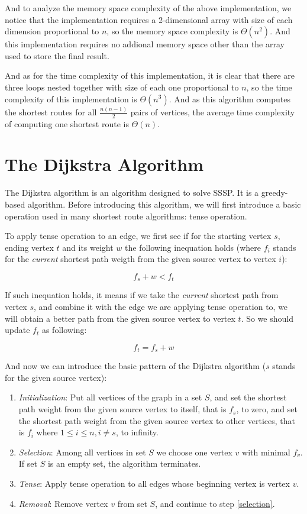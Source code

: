 \documentclass[a4paper,11pt,twocolumn]{article}
\begin{document}
And to analyze the memory space complexity of the above implementation, we notice that the implementation requires a 2-dimensional array with size of each dimension proportional to $n$, so the memory space complexity is $\Theta(n^2)$. And this implementation requires no addional memory space other than the array used to store the final result. 

And as for the time complexity of this implementation, it is clear that there are three loops nested together with size of each one proportional to $n$, so the time complexity of this implementation is $\Theta(n^3)$. And as this algorithm computes the shortest routes for all $\frac{n(n-1)}{2}$ pairs of vertices, the average time complexity of computing one shortest route is $\Theta(n)$. 

\section{The Dijkstra Algorithm}

The Dijkstra algorithm is an algorithm designed to solve SSSP. It is a greedy-based algorithm. Before introducing this algorithm, we will first introduce a basic operation used in many shortest route algorithms: tense operation. 

To apply tense operation to an edge, we first see if for the starting vertex $s$, ending vertex $t$ and its weight $w$ the following inequation holds (where $f_i$ stands for the \emph{current} shortest path weigth from the given source vertex to vertex $i$): 

$$f_s+w<f_t$$

If such inequation holds, it means if we take the \emph{current} shortest path from vertex $s$, and combine it with the edge we are applying tense operation to, we will obtain a better path from the given source vertex to vertex $t$. So we should update $f_t$ as following: 

$$f_t=f_s+w$$

And now we can introduce the basic pattern of the Dijkstra algorithm ($s$ stands for the given source vertex): 

\begin{enumerate}

\item{\emph{Initialization}: Put all vertices of the graph in a set $S$, and set the shortest path weight from the given source vertex to itself, that is $f_s$, to zero, and set the shortest path weight from the given source vertex to other vertices, that is $f_i$ where $1\le i \le n,i\ne s$, to infinity. }

\item{\label{selection}\emph{Selection}: Among all vertices in set $S$ we choose one vertex $v$ with minimal $f_v$. If set $S$ is an empty set, the algorithm terminates. }

\item{\emph{Tense}: Apply tense operation to all edges whose beginning vertex is vertex $v$. }

\item{\emph{Removal}: Remove vertex $v$ from set $S$, and continue to step \ref{selection}. }

\end{enumerate}
\end{document}
